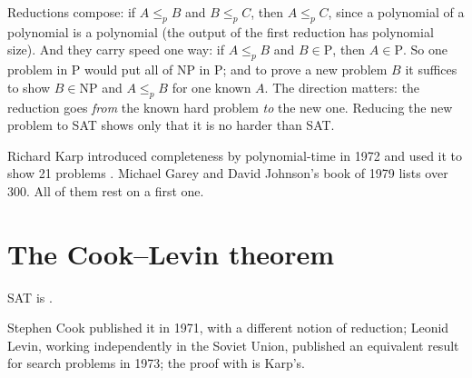 Reductions compose: if $A \le_p B$ and $B \le_p C$, then $A \le_p C$, since a polynomial of a polynomial is a polynomial (the output of the first reduction has polynomial size). And they carry speed one way: if $A \le_p B$ and $B \in \mathrm{P}$, then $A \in \mathrm{P}$. So one  problem in P would put all of NP in P; and to prove a new problem $B$  it suffices to show $B \in \mathrm{NP}$ and $A \le_p B$ for one known  $A$. The direction matters: the reduction goes \emph{from} the known hard problem \emph{to} the new one. Reducing the new problem to SAT shows only that it is no harder than SAT.

Richard Karp introduced completeness by polynomial-time  in 1972 and used it to show 21 problems . %
Michael Garey and David Johnson's book of 1979 lists over 300. %
All of them rest on a first one.

\section{The Cook--Levin theorem}\label{sec:b3:np-completeness:cook-levin}

\begin{theorem}\label{thm:b3:np-completeness:cook-levin}
SAT is .
\end{theorem}

Stephen Cook published it in 1971, with a different notion of reduction; Leonid Levin, working independently in the Soviet Union, published an equivalent result for search problems in 1973; the proof with  is Karp's. %

